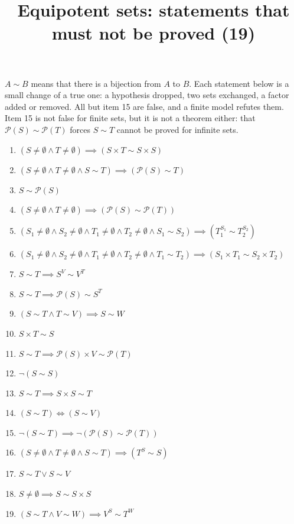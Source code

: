 \documentclass[11pt,a4paper]{article}
\title{Equipotent sets: statements that must not be proved (19)}
\author{}
\date{}
\begin{document}
\maketitle
$A \sim B$ means that there is a bijection from $A$ to $B$. Each statement below is a small change of a true one: a hypothesis dropped, two sets exchanged, a factor added or removed. All but item 15 are false, and a finite model refutes them. Item 15 is not false for finite sets, but it is not a theorem either: that $\mathcal{P}(S) \sim \mathcal{P}(T)$ forces $S \sim T$ cannot be proved for infinite sets.

\begin{enumerate}
\item $\displaystyle (S \neq \emptyset \land T \neq \emptyset) \implies (S \times T \sim S \times S)$
\item $\displaystyle (S \neq \emptyset \land T \neq \emptyset \land S \sim T) \implies (\mathcal{P}(S) \sim T)$
\item $\displaystyle S \sim \mathcal{P}(S)$
\item $\displaystyle (S \neq \emptyset \land T \neq \emptyset) \implies (\mathcal{P}(S) \sim \mathcal{P}(T))$
\item $\displaystyle (S_{1} \neq \emptyset \land S_{2} \neq \emptyset \land T_{1} \neq \emptyset \land T_{2} \neq \emptyset \land S_{1} \sim S_{2}) \implies (T_{1}^{S_{1}} \sim T_{2}^{S_{2}})$
\item $\displaystyle (S_{1} \neq \emptyset \land S_{2} \neq \emptyset \land T_{1} \neq \emptyset \land T_{2} \neq \emptyset \land T_{1} \sim T_{2}) \implies (S_{1} \times T_{1} \sim S_{2} \times T_{2})$
\item $\displaystyle S \sim T \implies S^{V} \sim V^{T}$
\item $\displaystyle S \sim T \implies \mathcal{P}(S) \sim S^{T}$
\item $\displaystyle (S \sim T \land T \sim V) \implies S \sim W$
\item $\displaystyle S \times T \sim S$
\item $\displaystyle S \sim T \implies \mathcal{P}(S) \times V \sim \mathcal{P}(T)$
\item $\displaystyle \lnot (S \sim S)$
\item $\displaystyle S \sim T \implies S \times S \sim T$
\item $\displaystyle (S \sim T) \iff (S \sim V)$
\item $\displaystyle \lnot (S \sim T) \implies \lnot (\mathcal{P}(S) \sim \mathcal{P}(T))$
\item $\displaystyle (S \neq \emptyset \land T \neq \emptyset \land S \sim T) \implies (T^{S} \sim S)$
\item $\displaystyle S \sim T \lor S \sim V$
\item $\displaystyle S \neq \emptyset \implies S \sim S \times S$
\item $\displaystyle (S \sim T \land V \sim W) \implies V^{S} \sim T^{W}$
\end{enumerate}
\end{document}
